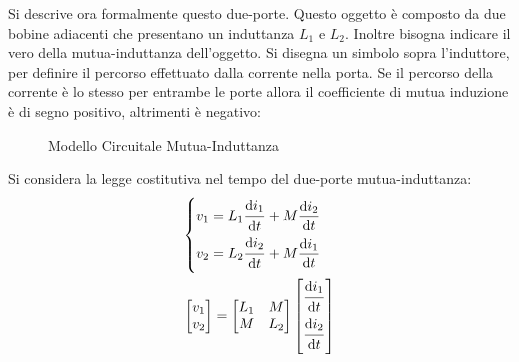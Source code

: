 \documentclass{article}
\newcommand{\df}{\mathrm{d}}
\numberwithin{equation}{subsection}
\begin{document}
Si descrive ora formalmente questo due-porte. Questo oggetto è composto da due bobine adiacenti che presentano un induttanza $L_1$ e $L_2$. Inoltre 
bisogna indicare il vero della mutua-induttanza dell'oggetto. Si disegna un simbolo sopra l'induttore, per definire il percorso effettuato dalla corrente nella porta. 
Se il percorso della corrente è lo stesso per entrambe le porte allora il coefficiente di mutua induzione è di segno positivo, altrimenti è negativo:
\begin{figure}[H]%
    \centering
    \qquad
    \caption{Modello Circuitale Mutua-Induttanza}%
    \label{fig:mutua-induttanza}
\end{figure}
Si considera la legge costitutiva nel tempo del due-porte mutua-induttanza:
\begin{gather*}
    \begin{cases}
        v_1=L_1\displaystyle\frac{\strut \df i_1}{\strut \df t}+M\frac{\df i_2}{\df t}\\
        v_2=L_2\displaystyle\frac{\strut \df i_2}{\strut \df t}+M\frac{\df i_1}{\df t}
    \end{cases}\\
    \begin{bmatrix}
        v_1\\v_2
    \end{bmatrix}=\begin{bmatrix}
        L_1&M\\M&L_2
    \end{bmatrix}\begin{bmatrix}
        \displaystyle\frac{\strut \df i_1}{\strut \df t}\\ \displaystyle\frac{\strut \df i_2}{\strut \df t}
    \end{bmatrix}
\end{gather*}
\end{document}
